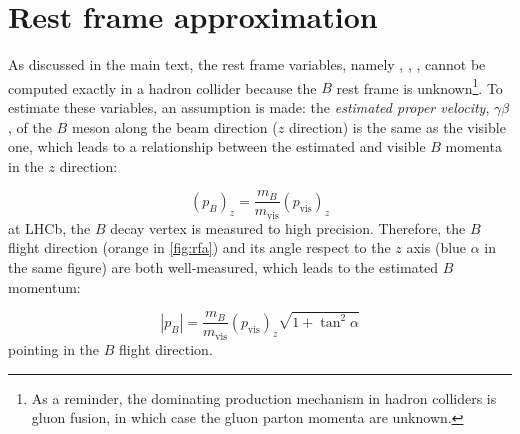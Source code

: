 \chapter{Rest frame approximation}
\label{appx:rfa}

As discussed in the main text,
the rest frame variables, namely \mmSq, \el, \qSq, cannot be computed exactly
in a hadron collider because the $B$ rest frame is unknown\footnote{
    As a reminder, the dominating \bbbar production mechanism in hadron
    colliders is gluon fusion,
    in which case the gluon parton momenta are unknown.
}.
To estimate these variables, an assumption is made:
the \emph{estimated proper velocity}, $\gamma \beta$,
of the $B$ meson along the beam direction ($z$ direction) is the same as the
visible one,
which leads to a relationship between the estimated and visible $B$ momenta
in the $z$ direction:

\begin{equation}
    (p_B)_z = \frac{m_B}{m_\text{vis}}(p_\text{vis})_z
\end{equation}
at LHCb, the $B$ decay vertex is measured to high precision.
Therefore, the $B$ flight direction (orange in \cref{fig:rfa}) and its angle
respect to the $z$ axis (blue $\alpha$ in the same figure) are both
well-measured, which leads to the estimated $B$ momentum:

\begin{equation}
    |p_B| = \frac{m_B}{m_\text{vis}} (p_\text{vis})_z \sqrt{1 + \tan^2\alpha}
\end{equation}
pointing in the $B$ flight direction.


